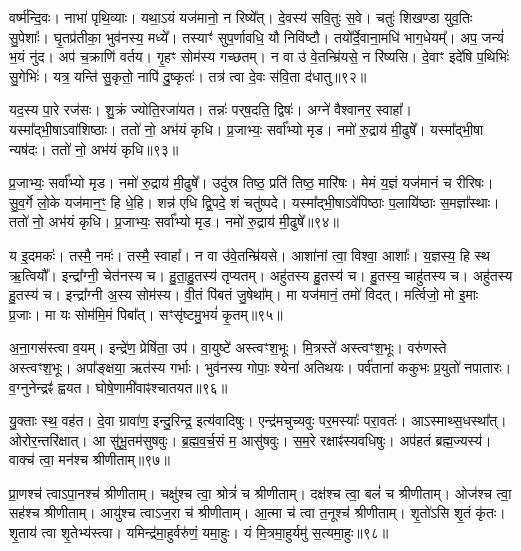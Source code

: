 वर्ष्म॑न्दि॒वः।
नाभा॑ पृथि॒व्याः।
यथा॒ऽयं यज॑मानो॒ न रिष्ये᳚त्।
दे॒वस्य॑ सवि॒तुः स॒वे।
चतुः॑ शिखण्डा युव॒तिः सु॒पेशाः᳚।
घृ॒तप्र॑तीका॒ भुव॑नस्य॒ मध्ये᳚।
तस्याꣳ॑ सुप॒र्णावधि॒ यौ निवि॑ष्टौ।
तयो᳚र्दे॒वाना॒मधि॑ भाग॒\-धेयम्᳚।
अप॒ जन्यं॑ भ॒यं नु॑द।
अप॑ च॒क्राणि॑ वर्तय।
गृ॒हꣳ सोम॑स्य गच्छतम्।
न वा उ॑ वे॒तन्म्रि॑यसे॒ न रि॑ष्यसि।
दे॒वाꣳ इदे॑षि प॒थिभिः॑ सु॒गेभिः॑।
यत्र॒ यन्ति॑ सु॒कृतो॒ नापि॑ दु॒ष्कृतः॑।
तत्र॑ त्वा दे॒वः स॑वि॒ता द॑धातु॥९२॥\ip{}

यद॒स्य पा॒रे रज॑सः।
शु॒क्रं  ज्योति॒रजा॑यत।
तन्नः॑ पर्‌\mbox{}ष॒दति॒ द्विषः॑।
अग्ने॑ वैश्वानर॒ स्वाहा᳚।
यस्मा᳚द्भी॒षा\-ऽवा॑शिष्ठाः।
ततो॑ नो॒ अभ॑यं कृधि।
प्र॒जाभ्यः॒ सर्वा᳚भ्यो मृड।
नमो॑ रु॒द्राय॑ मी॒ढुषे᳚।
यस्मा᳚द्भी॒षा न्यष॑दः।
ततो॑ नो॒ अभ॑यं कृधि॥९३॥\ip

प्र॒जाभ्यः॒ सर्वा᳚भ्यो मृड।
नमो॑ रु॒द्राय॑ मी॒ढुषे᳚।
उदु॑स्र तिष्ठ॒ प्रति॑ तिष्ठ॒ मारि॑षः।
मेमं य॒ज्ञं यज॑मानं च रीरिषः।
सु॒व॒र्गे लो॒के यज॑मान॒ꣳ॒ हि धे॒हि।
शन्न॑ एधि द्वि॒पदे॒ शं चतु॑ष्पदे।
यस्मा᳚द्भी॒षा\-ऽवे॑पिष्ठाः प॒लायि॑ष्ठाः स॒मज्ञा᳚स्थाः।
ततो॑ नो॒ अभ॑यं कृधि।
प्र॒जाभ्यः॒ सर्वा᳚भ्यो मृड।
नमो॑ रु॒द्राय॑ मी॒ढुषे᳚॥९४॥\ip

य इ॒दमकः॑।
तस्मै॒ नमः॑।
तस्मै॒ स्वाहा᳚।
न वा उ॑वे॒तन्म्रि॑यसे।
आशा॑नां त्वा॒ विश्वा॒ आशाः᳚।
य॒ज्ञस्य॒ हि स्थ ऋ॒त्वियौ᳚।
इन्द्रा᳚ग्नी॒ चेत॑नस्य च।
हु॒ता॒हु॒तस्य॑ तृप्यतम्।
अहु॑तस्य हु॒तस्य॑ च।
हु॒तस्य॒ चाहु॑तस्य च।
अहु॑तस्य हु॒तस्य॑ च।
इन्द्रा᳚ग्नी अ॒स्य सोम॑स्य।
वी॒तं पि॑बतं जु॒षेथा᳚म्।
मा यज॑मानं॒ तमो॑ विदत्।
मर्त्विजो॒ मो इ॒माः प्र॒जाः।
मा यः सोम॑मि॒मं पिबा᳚त्।
सꣳसृ॑ष्टमु॒भयं॑ कृ॒तम्॥९५॥\ip\anuvakamend[कृ॒धि॒ मी॒ढुषे\-ऽहु॑तस्य च स॒प्त च॑]

अ॒ना॒गस॑स्त्वा व॒यम्।
इन्द्रे॑ण॒ प्रेषि॑ता॒ उप॑।
वा॒युष्टे॑ अस्त्वꣳश॒भूः।
मि॒त्रस्ते॑ अस्त्वꣳश॒भूः।
वरु॑णस्ते अस्त्वꣳश॒भूः।
अपा᳚ङ्क्षया॒ ऋत॑स्य गर्भाः।
भुव॑नस्य गोपाः॒ श्येना॑ अतिथयः।
पर्व॑तानां ककुभः प्र॒युतो॑ नपातारः।
व॒ग्नुनेन्द्रꣴ॑ ह्वयत।
घोषे॒णामी॑वाꣴश्चातयत॥९६॥\ip

यु॒क्ताः स्थ॒ वह॑त।
दे॒वा ग्रावा॑ण॒ इन्दु॒रिन्द्र॒ इत्य॑वादिषुः।
एन्द्र॑मचुच्यवुः पर॒मस्याः᳚ परा॒वतः॑।
आऽस्माथ्स॒धस्था᳚त्।
ओरोर॒न्तरि॑क्षात्।
आ सु॑भू॒तम॑सुषवुः।
ब्र॒ह्म॒व॒र्च॒सं म॒ आसु॑षवुः।
स॒म॒रे रक्षाꣴ॑स्यवधिषुः।
अप॑हतं ब्रह्म॒ज्यस्य॑।
वाक्च॑ त्वा॒ मन॑श्च श्रीणीताम्॥९७॥\ip

प्रा॒णश्च॑ त्वा\-ऽपा॒नश्च॑ श्रीणीताम्।
चक्षु॑श्च त्वा॒ श्रोत्रं॑ च श्रीणीताम्।
दक्ष॑श्च त्वा॒ बलं॑ च श्रीणीताम्।
ओज॑श्च त्वा॒ सह॑श्च श्रीणीताम्।
आयु॑श्च त्वा\-ऽज॒रा च॑ श्रीणीताम्।
आ॒त्मा च॑ त्वा त॒नूश्च॑ श्रीणीताम्।
शृ॒तो॑ऽसि शृ॒तं कृ॑तः।
शृ॒ताय॑ त्वा शृ॒तेभ्य॑स्त्वा।
यमिन्द्र॑मा॒हुर्वरु॑णं॒ यमा॒हुः।
यं मि॒त्रमा॒हुर्यमु॑ स॒त्यमा॒हुः॥९८॥\ip

